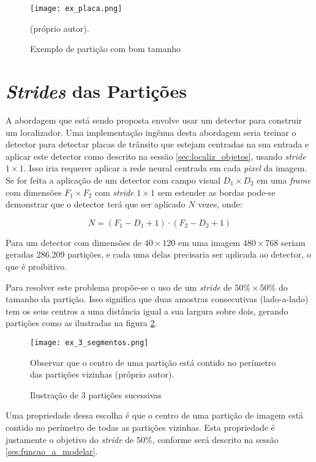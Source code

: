 \begin{figure}[!htb]
	\centering
	\texttt{[image: ex\_placa.png]}
	\caption{Exemplo de partição com bom tamanho}
	\label{fig:ex_placa}
	(próprio autor).
\end{figure}

\section{\emph{Strides} das Partições}
A abordagem que está sendo proposta envolve usar um detector para construir um
localizador. Uma implementação ingênua desta abordagem seria treinar o detector
para detectar placas de trânsito que estejam centradas na sua entrada e aplicar
este detector como descrito na sessão \ref{sec:localiz_objetos}, usando
\emph{stride} $1 \times 1$.  Isso iria requerer aplicar a rede neural centrada
em cada \emph{pixel} da imagem. Se for feita a aplicação de um detector com
campo visual $D_1 \times D_2$ em uma \emph{frame} com dimensões $F_1 \times
F_2$ com \emph{stride} $1 \times 1$ sem estender as bordas pode-se demonstrar
que o detector terá que ser aplicado $N$ vezes, onde:

\begin{equation}
	N = (F_1 - D_1 + 1) \cdot (F_2 - D_2 + 1)
\end{equation}

Para um detector com dimensões  de $40 \times 120$ em uma imagem
$480 \times 768$ seriam geradas 286.209 partições, e cada uma delas precisaria
ser aplicada ao detector, o que é proibitivo.

Para resolver este problema propõe-se o uso de um \emph{stride} de
$50\% \times 50\%$ do tamanho da partição. Isso significa que duas amostras
consecutivas (lado-a-lado) tem os seus centros a uma distância igual a sua
largura sobre dois, gerando partições como as ilustradas na figura
\ref{fig:ex_3_segmentos}.

\begin{figure}[!htb]
	\centering
	\texttt{[image: ex\_3\_segmentos.png]}
	\caption{Ilustração de 3 partições sucessivas}
	\label{fig:ex_3_segmentos}
	Observar que o centro de uma partição está contido no perímetro das
	partições vizinhas (próprio autor).
\end{figure}

Uma propriedade dessa escolha é que o centro de uma partição de imagem está
contido no perímetro de todas as partições vizinhas. Esta propriedade é
justamente o objetivo do \emph{stride} de 50\%, conforme será descrito na
sessão \ref{ses:funcao_a_modelar}.

